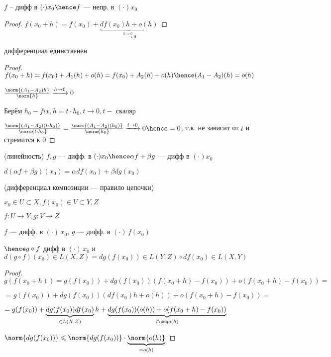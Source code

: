 \begin{properties}{}
    \item $f$ -- дифф в $(\cdot) x_0 \hence f $ --- непр. в $(\cdot) x_0$
    \begin{proof}
        $f(x_0 + h) = f(x_0) + \underbrace{df(x_0)h + o(h)}_{\xrightarrow{h \to 0}0}$
    \end{proof} 
    \item дифференциал единственен
    \begin{proof}
        $f(x_0 + h) = f(x_0) + A_1(h) + o(h) = f(x_0) + A_2(h) + o(h) \hence (A_1 - A_2)(h) = o(h)$

        $\frac{\norm{(A_1 - A_2)h}}{\norm{h}} \xrightarrow{h \to 0} 0$
    
        Берём $h_0 - fix, h = t \cdot h_0, t \to 0, t - $ скаляр

        $\frac{\norm{(A_1 - A_2)(t \cdot h_0)}}{\norm{t \cdot h_0}}  
        = \frac{\norm{(A_1 - A_2)(h_0)}}{\norm{h_0}} \xrightarrow{t \to 0} 0 \hence 
        = 0$, т.к. не зависит от $t$ и стремится к $0$ 
    \end{proof}

    \item (линейность) $f, g$ --- дифф. в $(\cdot) x_0 \hence \alpha f + \beta g $ --- дифф  в $(\cdot) x_0 $
    
    $d(\alpha f + \beta g)(x_0) = \alpha df(x_0) + \beta dg(x_0)$

    \item (дифференциал композиции --- правило цепочки)
    
    $x_0 \in U \subset X, f(x_0) \in V \subset Y, Z$

    $f : U \to Y, g : V \to Z$

    $f$ --- дифф. в $(\cdot)\, x_0$, 
    $g$ --- дифф. в $(\cdot)\, f(x_0)$

    $\hence g \circ f $ дифф в $(\cdot)\, x_0$ и $d(g \circ f) (x_0) \in L(X, Z)  = dg(f(x_0)) \in L(Y, Z) \circ df(x_0) \in L(X, Y)$
\newpage
    \begin{proof}
        $g(f(x_0 + h)) = g(f(x_0)) + dg(f(x_0))(f(x_0 + h) - f(x_0)) + o(f(x_0 + h) - f(x_0)) = $ 
        
        $= g(f(x_0)) + dg(f(x_0))(df(x_0)h + o(h)) + o(f(x_0 + h) - f(x_0)) = $


        $= g(f(x_0)) + \underbrace{dg(f(x_0)) df(x_0)}_{\in L(X, Z)} h + \underbrace{dg(f(x_0))(o(h)) + o(f(x_0 + h) - f(x_0))}_{?\ceq o(h)}$

        $\norm{dg(f(x_0))} \leqslant \norm{dg(f(x_0))} \cdot \underbrace{\norm{o(h)}}_{=o(h)}$


\end{proof}
\end{properties}
